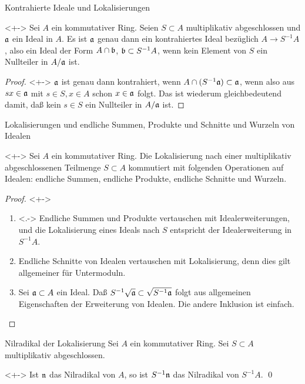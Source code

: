 \begin{frame}{Kontrahierte Ideale und Lokalisierungen}
	\begin{proposition}<+->
		Sei \(A\) ein kommutativer Ring. Seien \(S \subset A\) multiplikativ abgeschlossen und \(\mathfrak{a}\) ein Ideal in \(A\).
		Es ist \(\mathfrak{a}\) genau dann ein kontrahiertes Ideal bezüglich \(A \to S^{-1} A\), also ein Ideal der Form
		\(A \cap \mathfrak{b}\), \(\mathfrak{b} \subset S^{-1} A\),
		wenn kein Element von \(S\) ein Nullteiler in \(A/\mathfrak{a}\) ist.
	\end{proposition}
	\begin{proof}<+->
		\(\mathfrak{a}\) ist genau dann kontrahiert, wenn \(A \cap (S^{-1} \mathfrak{a}) \subset \mathfrak{a}\), wenn also aus \(s x \in
		\mathfrak{a}\) mit \(s \in S, x \in A\) schon \(x \in \mathfrak{a}\) folgt. Das ist wiederum gleichbedeutend damit, daß
		kein \(s \in S\) ein Nullteiler in \(A/\mathfrak{a}\) ist.
	\end{proof}
\end{frame}

\begin{frame}{Lokalisierungen und endliche Summen, Produkte und Schnitte und Wurzeln von Idealen}
	\begin{proposition}<+->
		Sei \(A\) ein kommutativer Ring. Die Lokalisierung nach einer multiplikativ abgeschlossenen
		Teilmenge \(S \subset A\) kommutiert mit folgenden Operationen auf Idealen: endliche Summen,
		endliche Produkte, endliche Schnitte und Wurzeln.
	\end{proposition}
	\begin{proof}<+->
		\begin{enumerate}[<+->]
		\item<.->
			Endliche Summen und Produkte vertauschen mit Idealerweiterungen, und die Lokalisierung
			eines Ideals nach \(S\) entspricht der Idealerweiterung in \(S^{-1} A\).
		\item
			Endliche Schnitte von Idealen vertauschen mit Lokalisierung, denn dies gilt allgemeiner für Untermoduln.
		\item
			Sei \(\mathfrak{a} \subset A\) ein Ideal. Daß \(S^{-1} \sqrt{\mathfrak{a}} \subset \sqrt{S^{-1} \mathfrak{a}}\)
			folgt aus allgemeinen Eigenschaften der Erweiterung von Idealen. Die andere Inklusion ist einfach.
			\qedhere
		\end{enumerate}		
	\end{proof}
\end{frame}

\begin{frame}{Nilradikal der Lokalisierung}
	Sei \(A\) ein kommutativer Ring. Sei \(S \subset A\) multiplikativ abgeschlossen.
	\begin{corollary}<+->
		Ist \(\mathfrak{n}\) das Nilradikal von \(A\), so ist \(S^{-1} \mathfrak{n}\) das Nilradikal von \(S^{-1} A\).
		\qed
	\end{corollary}
\end{frame}

